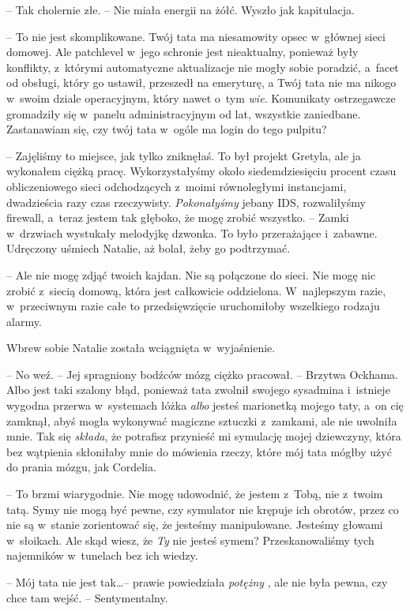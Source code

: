 \documentclass[oneside,polish,11pt,sfheadings]{mwbk}
\begin{document}
-- Tak cholernie złe. -- Nie miała energii na żółć. Wyszło jak
kapitulacja.

-- To nie jest skomplikowane. Twój tata ma niesamowity opsec w~głównej
sieci domowej. Ale patchlevel w~jego schronie jest nieaktualny, ponieważ
były konflikty, z~którymi automatyczne aktualizacje nie mogły sobie
poradzić, a~facet od obsługi, który go ustawił, przeszedł na emeryturę,
a Twój tata nie ma nikogo w~swoim dziale operacyjnym, który nawet o~tym
\textit{wie}. Komunikaty ostrzegawcze gromadziły się w~panelu
administracyjnym od lat, wszystkie zaniedbane. Zastanawiam się, czy twój
tata w~ogóle ma login do tego pulpitu?

-- Zajęliśmy to miejsce, jak tylko zniknęłaś. To był projekt Gretyla, ale
ja wykonałem ciężką pracę. Wykorzystałyśmy około siedemdziesięciu
procent czasu obliczeniowego sieci odchodzących z~moimi równoległymi
instancjami, dwadzieścia razy czas rzeczywisty. \textit{Pokonałyśmy}
jebany IDS, rozwaliłyśmy firewall, a~teraz jestem tak głęboko, że mogę
zrobić wszystko. -- Zamki w~drzwiach wystukały melodyjkę dzwonka. To było
przerażające i~zabawne. Udręczony uśmiech Natalie, aż bolał, żeby go
podtrzymać.

-- Ale nie mogę zdjąć twoich kajdan. Nie są połączone do sieci. Nie mogę
nic zrobić z~siecią domową, która jest całkowicie oddzielona. W~najlepszym razie, w~przeciwnym razie całe to przedsięwzięcie
uruchomiłoby wszelkiego rodzaju alarmy.

Wbrew sobie Natalie została wciągnięta w~wyjaśnienie. 

-- No weź. -- Jej spragniony bodźców mózg ciężko pracował. -- Brzytwa Ockhama. Albo jest
taki szalony błąd, ponieważ tata zwolnił swojego sysadmina i~istnieje
wygodna przerwa w~systemach łóżka \textit{albo} jesteś marionetką mojego
taty, a~on cię zamknął, abyś mogła wykonywać magiczne sztuczki z~zamkami, ale nie uwolniła mnie. Tak się \textit{składa}, że potrafisz
przynieść mi symulację mojej dziewczyny, która bez wątpienia skłoniłaby
mnie do mówienia rzeczy, które mój tata mógłby użyć do prania mózgu, jak
Cordelia.

-- To brzmi wiarygodnie. Nie mogę udowodnić, że jestem z~Tobą, nie z~twoim tatą. Symy nie mogą być pewne, czy symulator nie krępuje ich
obrotów, przez co nie są w~stanie zorientować się, że jesteśmy
manipulowane. Jesteśmy głowami w~słoikach. Ale skąd wiesz, że \textit{Ty}
nie jesteś symem? Przeskanowaliśmy tych najemników w~tunelach bez ich
wiedzy.

-- Mój tata nie jest tak\ldots  -- prawie powiedziała \textit{potężny }, ale nie
była pewna, czy chce tam wejść. -- Sentymentalny.
\end{document}
